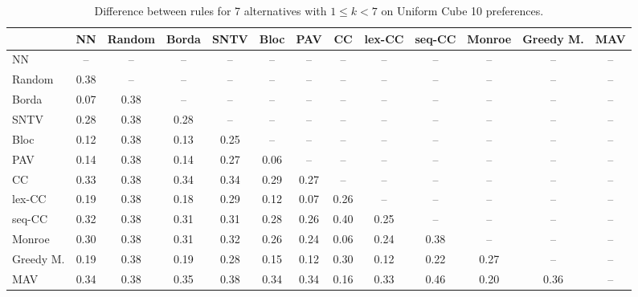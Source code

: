 
\begin{table*}[htbp]
\centering
\begin{tabular}{lcccccccccccc}
\toprule
 & NN & Random & Borda & SNTV & Bloc & PAV & CC & lex-CC & seq-CC & Monroe & Greedy M. & MAV \\
\midrule
NN & -- & -- & -- & -- & -- & -- & -- & -- & -- & -- & -- & -- \\
Random & \cellcolor{blue!38} 0.38 & -- & -- & -- & -- & -- & -- & -- & -- & -- & -- & -- \\
Borda & \cellcolor{blue!7} 0.07 & \cellcolor{blue!38} 0.38 & -- & -- & -- & -- & -- & -- & -- & -- & -- & -- \\
SNTV & \cellcolor{blue!28} 0.28 & \cellcolor{blue!38} 0.38 & \cellcolor{blue!28} 0.28 & -- & -- & -- & -- & -- & -- & -- & -- & -- \\
Bloc & \cellcolor{blue!12} 0.12 & \cellcolor{blue!38} 0.38 & \cellcolor{blue!13} 0.13 & \cellcolor{blue!25} 0.25 & -- & -- & -- & -- & -- & -- & -- & -- \\
PAV & \cellcolor{blue!14} 0.14 & \cellcolor{blue!38} 0.38 & \cellcolor{blue!14} 0.14 & \cellcolor{blue!27} 0.27 & \cellcolor{blue!6} 0.06 & -- & -- & -- & -- & -- & -- & -- \\
CC & \cellcolor{blue!33} 0.33 & \cellcolor{blue!38} 0.38 & \cellcolor{blue!34} 0.34 & \cellcolor{blue!34} 0.34 & \cellcolor{blue!28} 0.29 & \cellcolor{blue!27} 0.27 & -- & -- & -- & -- & -- & -- \\
lex-CC & \cellcolor{blue!19} 0.19 & \cellcolor{blue!38} 0.38 & \cellcolor{blue!18} 0.18 & \cellcolor{blue!28} 0.29 & \cellcolor{blue!12} 0.12 & \cellcolor{blue!7} 0.07 & \cellcolor{blue!26} 0.26 & -- & -- & -- & -- & -- \\
seq-CC & \cellcolor{blue!32} 0.32 & \cellcolor{blue!38} 0.38 & \cellcolor{blue!31} 0.31 & \cellcolor{blue!31} 0.31 & \cellcolor{blue!28} 0.28 & \cellcolor{blue!26} 0.26 & \cellcolor{blue!40} 0.40 & \cellcolor{blue!25} 0.25 & -- & -- & -- & -- \\
Monroe & \cellcolor{blue!30} 0.30 & \cellcolor{blue!38} 0.38 & \cellcolor{blue!31} 0.31 & \cellcolor{blue!32} 0.32 & \cellcolor{blue!26} 0.26 & \cellcolor{blue!24} 0.24 & \cellcolor{blue!6} 0.06 & \cellcolor{blue!24} 0.24 & \cellcolor{blue!38} 0.38 & -- & -- & -- \\
Greedy M. & \cellcolor{blue!19} 0.19 & \cellcolor{blue!38} 0.38 & \cellcolor{blue!19} 0.19 & \cellcolor{blue!28} 0.28 & \cellcolor{blue!15} 0.15 & \cellcolor{blue!12} 0.12 & \cellcolor{blue!30} 0.30 & \cellcolor{blue!12} 0.12 & \cellcolor{blue!22} 0.22 & \cellcolor{blue!27} 0.27 & -- & -- \\
MAV & \cellcolor{blue!34} 0.34 & \cellcolor{blue!38} 0.38 & \cellcolor{blue!35} 0.35 & \cellcolor{blue!38} 0.38 & \cellcolor{blue!34} 0.34 & \cellcolor{blue!34} 0.34 & \cellcolor{blue!16} 0.16 & \cellcolor{blue!33} 0.33 & \cellcolor{blue!46} 0.46 & \cellcolor{blue!20} 0.20 & \cellcolor{blue!36} 0.36 & -- \\
\bottomrule
\end{tabular}

\caption{Difference between rules for 7 alternatives with $1 \leq k < 7$ on Uniform Cube 10 preferences.}
\label{tab:rule_distance_heatmap-m=[7]-pref_dist=euclidean__args__dimensions=10_-_space=uniform_cube}
\end{table*}
    
